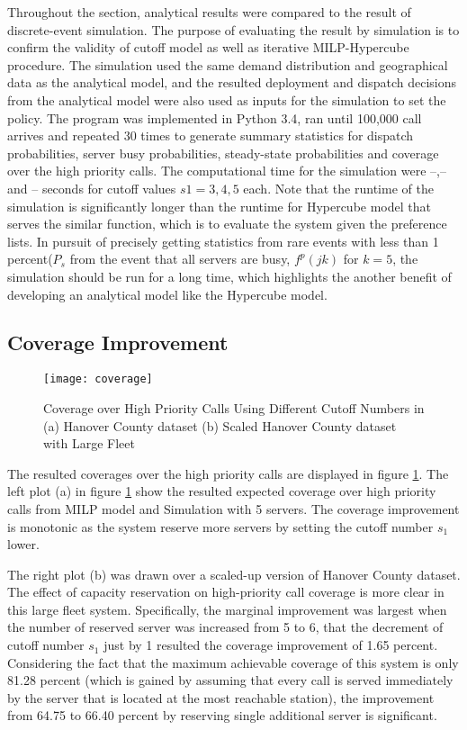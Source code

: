 \documentclass{article}
\begin{document}
Throughout the section, analytical results were compared to the result of discrete-event simulation. The purpose of evaluating the result by simulation is to confirm the validity of cutoff model as well as iterative MILP-Hypercube procedure. The simulation used the same demand distribution and geographical data as the analytical model, and the resulted deployment and dispatch decisions from the analytical model were also used as inputs for the simulation to set the policy. The program was implemented in Python 3.4, ran until 100,000 call arrives and repeated 30 times to generate summary statistics for dispatch probabilities, server busy probabilities, steady-state probabilities and coverage over the high priority calls. The computational time for the simulation were --,-- and -- seconds for cutoff values $s1=3,4,5$ each. Note that the runtime of the simulation is significantly longer than the runtime for Hypercube model that serves the similar function, which is to evaluate the system given the preference lists. In pursuit of precisely getting statistics from rare events with less than 1 percent($P_s$ from the event that all servers are busy, $f^p(jk)$ for $k=5$, the simulation should be run for a long time, which highlights the another benefit of developing an analytical model like the Hypercube model.



\subsection{Coverage Improvement}

\begin{figure}
\centering
\texttt{[image: coverage]} 
\caption{Coverage over High Priority Calls Using Different Cutoff Numbers in (a) Hanover County dataset (b) Scaled Hanover County dataset with Large Fleet}
\label{fig:coverage}
\end{figure}

The resulted coverages over the high priority calls are displayed in figure \ref{fig:coverage}. The left plot (a) in figure \ref{fig:coverage} show the resulted expected coverage over high priority calls from MILP model and Simulation with 5 servers. The coverage improvement is monotonic as the system reserve more servers by setting the cutoff number $s_1$ lower. 
 
The right plot (b) was drawn over a scaled-up version of Hanover County dataset. The effect of capacity reservation on high-priority call coverage is more clear in this large fleet system. Specifically, the marginal improvement was largest when the number of reserved server was increased from 5 to 6, that the decrement of cutoff number $s_1$ just by 1 resulted the coverage improvement of 1.65 percent. Considering the fact that the maximum achievable coverage of this system is only 81.28 percent (which is gained by assuming that every call is served immediately by the server that is located at the most reachable station), the improvement from 64.75 to 66.40 percent by reserving single additional server is significant.
\end{document}
